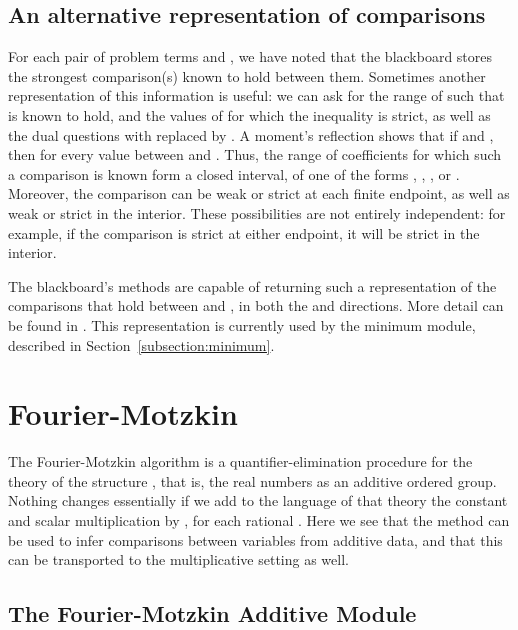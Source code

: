 \documentclass[runningheds]{llncs}
\begin{document}
\subsection{An alternative representation of comparisons}
\label{subsection:alternative:representation}

For each pair of problem terms  and , we have noted that the blackboard stores the strongest comparison(s) known to hold between them. Sometimes another representation of this information is useful: we can ask for the range of  such that  is known to hold, and the values of  for which the inequality is strict, as well as the dual questions with  replaced by . A moment's reflection shows that if  and , then  for every value  between  and . Thus, the range of coefficients  for which such a comparison is known form a closed interval, of one of the forms , , , or . Moreover, the comparison can be weak or strict at each finite endpoint, as well as weak or strict in the interior. These possibilities are not entirely independent: for example, if the comparison is strict at either endpoint, it will be strict in the interior.

The blackboard's methods are capable of returning such a representation of the comparisons that hold between  and , in both the  and  directions. More detail can be found in \cite{lewis:14}. This representation is currently used by the minimum module, described in Section~\ref{subsection:minimum}. 



\section{Fourier-Motzkin}
\label{section:fourier:motzkin}

The Fourier-Motzkin algorithm \cite{schrijver:86} is a quantifier-elimination procedure for the theory of the structure , that is, the real numbers as an additive ordered group. Nothing changes essentially if we add to the language of that theory the constant  and scalar multiplication by , for each rational . Here we see that the method can be used to infer comparisons between variables from additive data, and that this can be transported to the multiplicative setting as well.

\subsection{The Fourier-Motzkin Additive Module}
\label{subsection:fm:additive}
\end{document}
